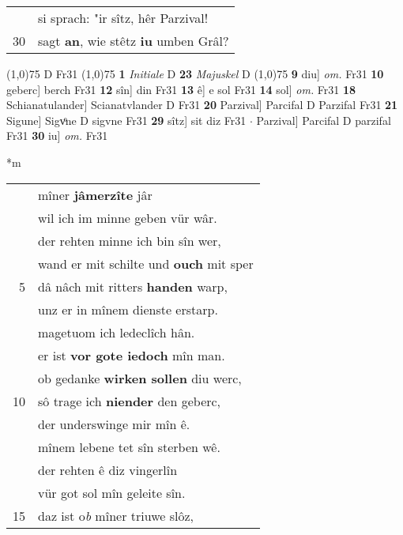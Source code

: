 \documentclass[8pt,a4paper,notitlepage]{article}
\begin{document}
\begin{table}[ht]
\begin{minipage}[t]{0.5\linewidth}
\begin{tabular}{rl}
 & si sprach: "ir sîtz, hêr Parzival!\\ 
30 & sagt \textbf{an}, wie stêtz \textbf{iu} umben Grâl?\\ 
\end{tabular}
\scriptsize
\line(1,0){75} \newline
D Fr31 \newline
\line(1,0){75} \newline
\textbf{1} \textit{Initiale} D  \textbf{23} \textit{Majuskel} D  \newline
\line(1,0){75} \newline
\textbf{9} diu] \textit{om.} Fr31 \textbf{10} geberc] berch Fr31 \textbf{12} sîn] din Fr31 \textbf{13} ê] e sol Fr31 \textbf{14} sol] \textit{om.} Fr31 \textbf{18} Schianatulander] Scianatvlander D Fr31 \textbf{20} Parzival] Parcifal D Parzifal Fr31 \textbf{21} Sigune] Sigvͦne D sigvne Fr31 \textbf{29} sîtz] sit diz Fr31  $\cdot$ Parzival] Parcifal D parzifal Fr31 \textbf{30} iu] \textit{om.} Fr31 \newline
\end{minipage}
\hspace{0.5cm}
\begin{minipage}[t]{0.5\linewidth}
\small
\begin{center}*m
\end{center}
\begin{tabular}{rl}
 & mîner \textbf{jâmerzîte} jâr\\ 
 & wil ich im minne geben vür wâr.\\ 
 & der rehten minne ich bin sîn wer,\\ 
 & wand er mit schilte und \textbf{ouch} mit sper\\ 
5 & dâ nâch mit ritters \textbf{handen} warp,\\ 
 & unz er in mînem dienste erstarp.\\ 
 & magetuom ich ledeclîch hân.\\ 
 & er ist \textbf{vor gote iedoch} mîn man.\\ 
 & ob gedanke \textbf{wirken sollen} diu werc,\\ 
10 & sô trage ich \textbf{niender} den geberc,\\ 
 & der underswinge mir mîn ê.\\ 
 & mînem lebene tet sîn sterben wê.\\ 
 & der rehten ê diz vingerlîn\\ 
 & vür got sol mîn geleite sîn.\\ 
15 & daz ist o\textit{b} mîner triuwe slôz,\\ 

\end{tabular}
\end{minipage}
\end{table}
\end{document}
